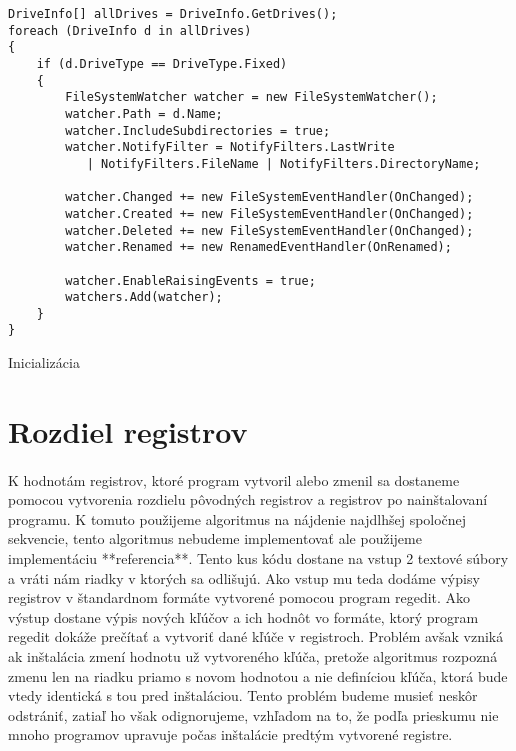 \begin{listing}
\begin{verbatim}
DriveInfo[] allDrives = DriveInfo.GetDrives();
foreach (DriveInfo d in allDrives)
{
    if (d.DriveType == DriveType.Fixed) 
    { 
        FileSystemWatcher watcher = new FileSystemWatcher();
        watcher.Path = d.Name;
        watcher.IncludeSubdirectories = true;
        watcher.NotifyFilter = NotifyFilters.LastWrite
           | NotifyFilters.FileName | NotifyFilters.DirectoryName;

        watcher.Changed += new FileSystemEventHandler(OnChanged);
        watcher.Created += new FileSystemEventHandler(OnChanged);
        watcher.Deleted += new FileSystemEventHandler(OnChanged);
        watcher.Renamed += new RenamedEventHandler(OnRenamed);

        watcher.EnableRaisingEvents = true;
        watchers.Add(watcher);
    }
}         
\end{verbatim}
\caption{Inicializácia}
\label{lst:init}
\end{listing}

\section{Rozdiel registrov}
\paragraph{}
K hodnotám registrov, ktoré program vytvoril alebo zmenil sa dostaneme pomocou vytvorenia rozdielu pôvodných registrov a registrov po nainštalovaní programu. K tomuto použijeme algoritmus na nájdenie najdlhšej spoločnej sekvencie, tento algoritmus nebudeme implementovať ale použijeme implementáciu **referencia**. Tento kus kódu dostane na vstup 2 textové súbory a vráti nám riadky v ktorých sa odlišujú. Ako vstup mu teda dodáme výpisy registrov v štandardnom formáte vytvorené pomocou program regedit. Ako výstup dostane výpis nových kľúčov a ich hodnôt vo formáte, ktorý program regedit dokáže prečítať a vytvoriť dané kľúče v registroch. Problém avšak vzniká ak inštalácia zmení hodnotu už vytvoreného kľúča, pretože algoritmus rozpozná zmenu len na riadku priamo s novom hodnotou a nie definíciou kľúča, ktorá bude vtedy identická s tou pred inštaláciou. Tento problém budeme musieť neskôr odstrániť, zatiaľ ho však odignorujeme, vzhľadom na to, že podľa prieskumu nie mnoho programov upravuje počas inštalácie predtým vytvorené registre.